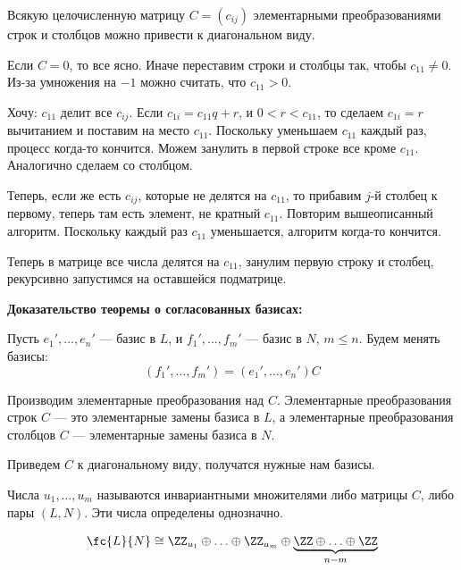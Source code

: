 \begin{prop}{}{}
    Всякую целочисленную матрицу \( C = (c_{ij}) \) элементарными преобразованиями
    строк и столбцов можно привести к диагональном виду.
\end{prop}

Если \( C = 0 \), то все ясно.
Иначе переставим строки и столбцы так, чтобы \( c_{11} \neq 0 \).
Из-за умножения на \( -1 \) можно считать, что \( c_{11} > 0 \).

Хочу: \( c_{11} \) делит все \( c_{ij} \).
Если \( c_{1i} = c_{11} q + r \), и \( 0 < r < c_{11} \),
то сделаем \( c_{1i} = r \) вычитанием и поставим на место \( c_{11} \).
Поскольку уменьшаем \( c_{11} \) каждый раз, процесс когда-то кончится.
Можем занулить в первой строке все кроме \( c_{11} \).
Аналогично сделаем со столбцом.

Теперь, если же есть \( c_{ij} \), которые не делятся на \( c_{11} \),
то прибавим \( j \)-й столбец к первому, теперь там есть элемент,
не кратный \( c_{11} \).
Повторим вышеописанный алгоритм.
Поскольку каждый раз \( c_{11} \) уменьшается,
алгоритм когда-то кончится.

Теперь в матрице все числа делятся на \( c_{11} \),
занулим первую строку и столбец,
рекурсивно запустимся на оставшейся подматрице.

\textbf{Доказательство теоремы о согласованных базисах:}

Пусть \( e_1', \ldots, e_n' \) --- базис в \( L \),
и \( f_1', \ldots, f_m' \) --- базис в \( N \), \( m \leq n \).
Будем менять базисы:
\[
    (f_1', \ldots, f_m') = (e_1', \ldots, e_n') C
\]

Производим элементарные преобразования над \( C \).
Элементарные преобразования строк \( C \) ---
это элементарные замены базиса в \( L \),
а элементарные преобразования столбцов \( C \)
--- элементарные замены базиса в \( N \).

Приведем \( C \) к диагональному виду,
получатся нужные нам базисы.

\begin{remark}{}{}
    Числа \( u_1, \ldots, u_m \) называются
    инвариантными множителями либо матрицы \( C \), либо пары \( (L, N) \).
    Эти числа определены однозначно.
\end{remark}

\begin{coroll}{}{}
    \[
        \fc{L}{N} \cong \ZZ_{u_1} \oplus \ldots \oplus \ZZ_{u_m} \oplus \underbrace{\ZZ \oplus \ldots \oplus \ZZ}_{n - m}
    \]
\end{coroll}

